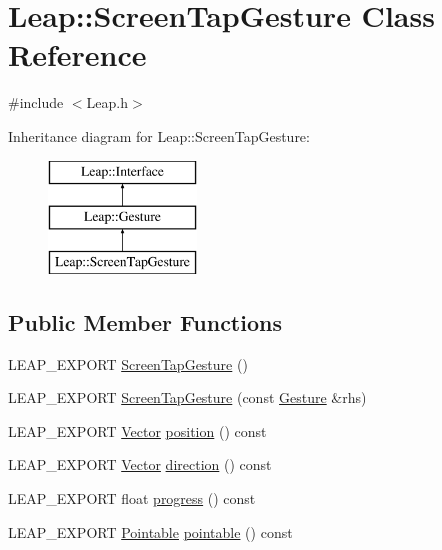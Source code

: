 \hypertarget{class_leap_1_1_screen_tap_gesture}{\section{Leap\+:\+:Screen\+Tap\+Gesture Class Reference}
\label{class_leap_1_1_screen_tap_gesture}
}


{\ttfamily \#include $<$Leap.\+h$>$}

Inheritance diagram for Leap\+:\+:Screen\+Tap\+Gesture\+:\begin{figure}[H]
\begin{center}
\leavevmode
\includegraphics[height=3.000000cm]{class_leap_1_1_screen_tap_gesture}
\end{center}
\end{figure}
\subsection*{Public Member Functions}
\begin{DoxyCompactItemize}
\item 
L\+E\+A\+P\+\_\+\+E\+X\+P\+O\+R\+T \hyperlink{class_leap_1_1_screen_tap_gesture_a9c58b16806da33ae61a090f16eb0f750}{Screen\+Tap\+Gesture} ()
\item 
L\+E\+A\+P\+\_\+\+E\+X\+P\+O\+R\+T \hyperlink{class_leap_1_1_screen_tap_gesture_a1f433e04b2e6adb7a95811c496397ab6}{Screen\+Tap\+Gesture} (const \hyperlink{class_leap_1_1_gesture}{Gesture} \&rhs)
\item 
L\+E\+A\+P\+\_\+\+E\+X\+P\+O\+R\+T \hyperlink{struct_leap_1_1_vector}{Vector} \hyperlink{class_leap_1_1_screen_tap_gesture_aec0c63617e76ed0826cc8276190bc21d}{position} () const 
\item 
L\+E\+A\+P\+\_\+\+E\+X\+P\+O\+R\+T \hyperlink{struct_leap_1_1_vector}{Vector} \hyperlink{class_leap_1_1_screen_tap_gesture_aadee36938c5dc63e26143c116ea130c4}{direction} () const 
\item 
L\+E\+A\+P\+\_\+\+E\+X\+P\+O\+R\+T float \hyperlink{class_leap_1_1_screen_tap_gesture_a08d454596c4b6d944bcdbef61f42249f}{progress} () const 
\item 
L\+E\+A\+P\+\_\+\+E\+X\+P\+O\+R\+T \hyperlink{class_leap_1_1_pointable}{Pointable} \hyperlink{class_leap_1_1_screen_tap_gesture_ab1b2c4ffac3fca7cf5710fa3a84773b4}{pointable} () const 
\end{DoxyCompactItemize}
